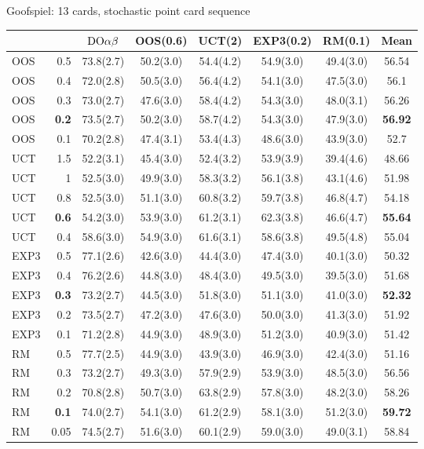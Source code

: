 \begin{table}[t!]
\centering
\begin{scriptsize}

Goofspiel: 13 cards, stochastic point card sequence
\begin{tabular}{|lr|ccccc|c|}\hline
&&$\textrm{DO}\alpha\beta$&OOS(0.6)&UCT(2)&EXP3(0.2)&RM(0.1)&Mean\\\hline
OOS&0.5&73.8(2.7)&50.2(3.0)&54.4(4.2)&54.9(3.0)&49.4(3.0)&56.54\\
OOS&0.4&72.0(2.8)&50.5(3.0)&56.4(4.2)&54.1(3.0)&47.5(3.0)&56.1\\
OOS&0.3&73.0(2.7)&47.6(3.0)&58.4(4.2)&54.3(3.0)&48.0(3.1)&56.26\\
OOS&\textbf{0.2}&73.5(2.7)&50.2(3.0)&58.7(4.2)&54.3(3.0)&47.9(3.0)&\textbf{56.92}\\
OOS&0.1&70.2(2.8)&47.4(3.1)&53.4(4.3)&48.6(3.0)&43.9(3.0)&52.7\\\hline
UCT&1.5&52.2(3.1)&45.4(3.0)&52.4(3.2)&53.9(3.9)&39.4(4.6)&48.66\\
UCT&1&52.5(3.0)&49.9(3.0)&58.3(3.2)&56.1(3.8)&43.1(4.6)&51.98\\
UCT&0.8&52.5(3.0)&51.1(3.0)&60.8(3.2)&59.7(3.8)&46.8(4.7)&54.18\\
UCT&\textbf{0.6}&54.2(3.0)&53.9(3.0)&61.2(3.1)&62.3(3.8)&46.6(4.7)&\textbf{55.64}\\
UCT&0.4&58.6(3.0)&54.9(3.0)&61.6(3.1)&58.6(3.8)&49.5(4.8)&55.04\\\hline
EXP3&0.5&77.1(2.6)&42.6(3.0)&44.4(3.0)&47.4(3.0)&40.1(3.0)&50.32\\
EXP3&0.4&76.2(2.6)&44.8(3.0)&48.4(3.0)&49.5(3.0)&39.5(3.0)&51.68\\
EXP3&\textbf{0.3}&73.2(2.7)&44.5(3.0)&51.8(3.0)&51.1(3.0)&41.0(3.0)&\textbf{52.32}\\
EXP3&0.2&73.5(2.7)&47.2(3.0)&47.6(3.0)&50.0(3.0)&41.3(3.0)&51.92\\
EXP3&0.1&71.2(2.8)&44.9(3.0)&48.9(3.0)&51.2(3.0)&40.9(3.0)&51.42\\\hline
RM&0.5&77.7(2.5)&44.9(3.0)&43.9(3.0)&46.9(3.0)&42.4(3.0)&51.16\\
RM&0.3&73.2(2.7)&49.3(3.0)&57.9(2.9)&53.9(3.0)&48.5(3.0)&56.56\\
RM&0.2&70.8(2.8)&50.7(3.0)&63.8(2.9)&57.8(3.0)&48.2(3.0)&58.26\\
RM&\textbf{0.1}&74.0(2.7)&54.1(3.0)&61.2(2.9)&58.1(3.0)&51.2(3.0)&\textbf{59.72}\\
RM&0.05&74.5(2.7)&51.6(3.0)&60.1(2.9)&59.0(3.0)&49.0(3.1)&58.84\\
\hline
\end{tabular}


\end{scriptsize}
\end{table}
